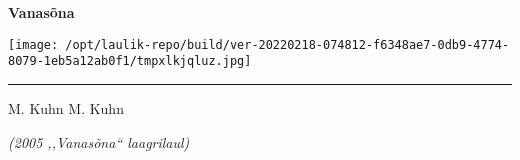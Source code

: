 \documentclass[10pt]{book}
\begin{document}
{
  \samepage
  \raggedbottom
  \raggedright
  \sloppy


  \vspace{0.2in}

  \noindent\begin{minipage}{.1\textwidth}
    \hfill\vspace{0.1in}
  \end{minipage}%
  \noindent\begin{minipage}{.8\textwidth}
    \centering
    \bfseries
    \large Vanasõna
  \end{minipage}%
  \noindent\begin{minipage}{.1\textwidth}
      \texttt{[image: /opt/laulik-repo/build/ver-20220218-074812-f6348ae7-0db9-4774-8079-1eb5a12ab0f1/tmpxlkjqluz.jpg]}
  \end{minipage}

  \nopagebreak[4]
  \vspace{0.1in}
  \nopagebreak[4]
  \hrule height 0.05ex
  \nopagebreak[4]
  \vspace{-0.05in}

  {\footnotesize M. Kuhn \hfill M. Kuhn }\\
  \vspace{0.01in}

  {\em {\footnotesize (2005 ,,Vanas\~ona{``} laagrilaul) } }
  \vspace{0.01in}

  \vspace{0.01in}
  \nopagebreak[4]
  {%
\parindent 0pt
\noindent
\ifx\preLilyPondExample \undefined
\else
  \expandafter\preLilyPondExample
\fi
\def\lilypondbook{}%

\ifx\postLilyPondExample \undefined
\else
  \expandafter\postLilyPondExample
\fi
}

}
\end{document}
